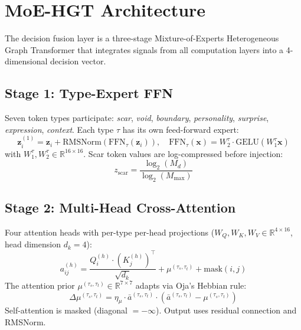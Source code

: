 \documentclass[11pt]{article}
\begin{document}
\section{MoE-HGT Architecture}
\label{sec:moehgt}

The decision fusion layer is a three-stage Mixture-of-Experts Heterogeneous Graph Transformer that integrates signals from all computation layers into a 4-dimensional decision vector.

\subsection{Stage 1: Type-Expert FFN}

Seven token types participate: \emph{scar}, \emph{void}, \emph{boundary}, \emph{personality}, \emph{surprise}, \emph{expression}, \emph{context}. Each type $\tau$ has its own feed-forward expert:
\begin{equation}
\mathbf{z}_i^{(1)} = \mathbf{z}_i + \text{RMSNorm}\!\left(\text{FFN}_\tau(\mathbf{z}_i)\right), \quad \text{FFN}_\tau(\mathbf{x}) = W_2^\tau \cdot \text{GELU}(W_1^\tau \mathbf{x})
\end{equation}
with $W_1^\tau, W_2^\tau \in \mathbb{R}^{16 \times 16}$. Scar token values are log-compressed before injection:
\begin{equation}
z_{\text{scar}} = \frac{\log_2(M_d)}{\log_2(M_{\max})}
\end{equation}

\subsection{Stage 2: Multi-Head Cross-Attention}

Four attention heads with per-type per-head projections ($W_Q, W_K, W_V \in \mathbb{R}^{4 \times 16}$, head dimension $d_k = 4$):
\begin{equation}
a_{ij}^{(h)} = \frac{Q_i^{(h)} \cdot (K_j^{(h)})^\top}{\sqrt{d_k}} + \mu^{(\tau_s, \tau_t)} + \text{mask}(i,j)
\end{equation}
The attention prior $\mu^{(\tau_s, \tau_t)} \in \mathbb{R}^{7 \times 7}$ adapts via Oja's Hebbian rule:
\begin{equation}
\Delta\mu^{(\tau_s, \tau_t)} = \eta_\mu \cdot \bar{a}^{(\tau_s, \tau_t)} \cdot \left(\bar{a}^{(\tau_s, \tau_t)} - \mu^{(\tau_s, \tau_t)}\right)
\end{equation}
Self-attention is masked (diagonal $= -\infty$). Output uses residual connection and RMSNorm.
\end{document}

